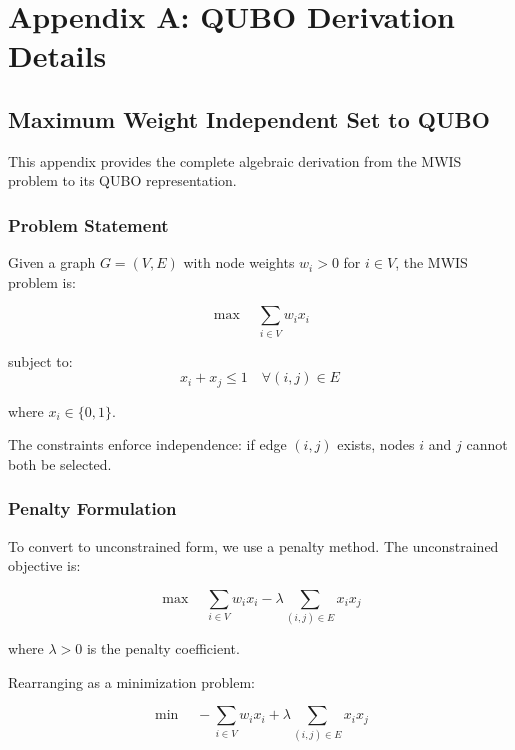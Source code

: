 \chapter*{Appendix A: QUBO Derivation Details}

\section{Maximum Weight Independent Set to QUBO}

This appendix provides the complete algebraic derivation from the MWIS problem to its QUBO representation.

\subsection{Problem Statement}

Given a graph $G = (V, E)$ with node weights $w_i > 0$ for $i \in V$, the MWIS problem is:

\begin{equation}
\max \quad \sum_{i \in V} w_i x_i
\end{equation}

subject to:
\begin{equation}
x_i + x_j \leq 1 \quad \forall (i,j) \in E
\end{equation}

where $x_i \in \{0, 1\}$.

The constraints enforce independence: if edge $(i,j)$ exists, nodes $i$ and $j$ cannot both be selected.

\subsection{Penalty Formulation}

To convert to unconstrained form, we use a penalty method. The unconstrained objective is:

\begin{equation}
\max \quad \sum_{i \in V} w_i x_i - \lambda \sum_{(i,j) \in E} x_i x_j
\end{equation}

where $\lambda > 0$ is the penalty coefficient.

Rearranging as a minimization problem:

\begin{equation}\label{eq:qubo-min-form}
\min \quad -\sum_{i \in V} w_i x_i + \lambda \sum_{(i,j) \in E} x_i x_j
\end{equation}

